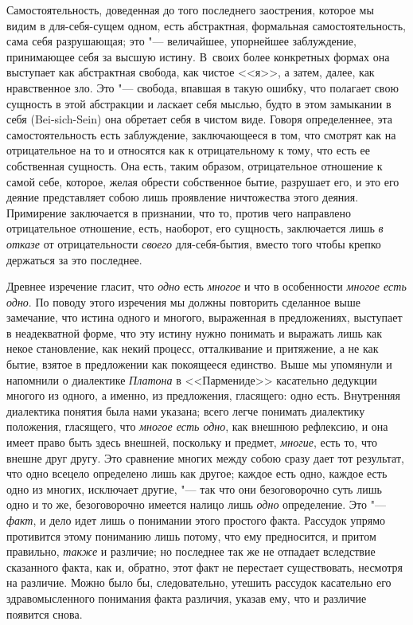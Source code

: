 Самостоятельность, доведенная до того последнего заострения, которое мы
видим в для-себя-сущем одном, есть абстрактная, формальная
самостоятельность, сама себя разрушающая; это "--- величайшее, упорнейшее
заблуждение, принимающее себя за высшую истину. В~своих более конкретных
формах она выступает как абстрактная свобода, как чистое <<я>>, а затем,
далее, как нравственное зло. Это "--- свобода, впавшая в такую ошибку, что
полагает свою сущность в этой абстракции и ласкает себя мыслью, будто в
этом замыкании в себя (Bei-sich-Sein) она обретает себя в чистом виде.
Говоря определеннее, эта самостоятельность есть заблуждение, заключающееся
в том, что смотрят как на отрицательное на то и относятся как к
отрицательному к тому, что есть ее собственная сущность. Она есть, таким
образом, отрицательное отношение к самой себе, которое, желая обрести
собственное бытие, разрушает его, и это его деяние представляет собою лишь
проявление ничтожества этого деяния. Примирение заключается в признании,
что то, против чего направлено отрицательное отношение, есть, наоборот, его
сущность, заключается лишь {\em в отказе} от
отрицательности {\em своего} для-себя-бытия, вместо
того чтобы крепко держаться за это последнее.

Древнее изречение гласит, что {\em одно} есть
{\em многое} и что в особенности
{\em многое есть одно}. По поводу этого изречения мы
должны повторить сделанное выше замечание, что истина одного и многого,
выраженная в предложениях, выступает в неадекватной форме, что эту истину
нужно понимать и выражать лишь как некое становление, как некий процесс,
отталкивание и притяжение, а не как бытие, взятое в предложении как
покоящееся единство. Выше мы упомянули и напомнили о диалектике
{\em Платона} в <<Пармениде>> касательно дедукции многого
из одного, а именно, из предложения, гласящего: одно есть. Внутренняя
диалектика понятия была нами указана; всего легче понимать диалектику
положения, гласящего, что {\em многое есть одно}, как
внешнюю рефлексию, и она имеет право быть здесь внешней, поскольку и
предмет, {\em многие}, есть то, что внешне друг другу.
Это сравнение многих между собою сразу дает тот результат, что одно всецело
определено лишь как другое; каждое есть одно, каждое есть одно из многих,
исключает другие, "--- так что они безоговорочно суть лишь одно и то же,
безоговорочно имеется налицо лишь {\em одно}
определение. Это "--- {\em факт}, и дело идет лишь о
понимании этого простого факта. Рассудок упрямо противится этому пониманию
лишь потому, что ему предносится, и притом правильно,
{\em также} и различие; но последнее так же не отпадает
вследствие сказанного факта, как и, обратно, этот факт не перестает
существовать, несмотря на различие. Можно было бы, следовательно, утешить
рассудок касательно его здравомысленного понимания факта различия, указав
ему, что и различие появится снова.

